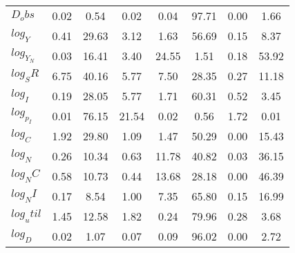 \begin{center}
\begin{longtable}{lccccccc}
$D_obs     $	 & 	        0.02	 & 	        0.54	 & 	        0.02	 & 	        0.04	 & 	       97.71	 & 	        0.00	 & 	        1.66 \\ 
$log_Y     $	 & 	        0.41	 & 	       29.63	 & 	        3.12	 & 	        1.63	 & 	       56.69	 & 	        0.15	 & 	        8.37 \\ 
$log_Y_N   $	 & 	        0.03	 & 	       16.41	 & 	        3.40	 & 	       24.55	 & 	        1.51	 & 	        0.18	 & 	       53.92 \\ 
$log_SR    $	 & 	        6.75	 & 	       40.16	 & 	        5.77	 & 	        7.50	 & 	       28.35	 & 	        0.27	 & 	       11.18 \\ 
$log_I     $	 & 	        0.19	 & 	       28.05	 & 	        5.77	 & 	        1.71	 & 	       60.31	 & 	        0.52	 & 	        3.45 \\ 
$log_p_I   $	 & 	        0.01	 & 	       76.15	 & 	       21.54	 & 	        0.02	 & 	        0.56	 & 	        1.72	 & 	        0.01 \\ 
$log_C     $	 & 	        1.92	 & 	       29.80	 & 	        1.09	 & 	        1.47	 & 	       50.29	 & 	        0.00	 & 	       15.43 \\ 
$log_N     $	 & 	        0.26	 & 	       10.34	 & 	        0.63	 & 	       11.78	 & 	       40.82	 & 	        0.03	 & 	       36.15 \\ 
$log_NC    $	 & 	        0.58	 & 	       10.73	 & 	        0.44	 & 	       13.68	 & 	       28.18	 & 	        0.00	 & 	       46.39 \\ 
$log_NI    $	 & 	        0.17	 & 	        8.54	 & 	        1.00	 & 	        7.35	 & 	       65.80	 & 	        0.15	 & 	       16.99 \\ 
$log_util  $	 & 	        1.45	 & 	       12.58	 & 	        1.82	 & 	        0.24	 & 	       79.96	 & 	        0.28	 & 	        3.68 \\ 
$log_D     $	 & 	        0.02	 & 	        1.07	 & 	        0.07	 & 	        0.09	 & 	       96.02	 & 	        0.00	 & 	        2.72 \\ 
\end{longtable}
 \end{center}
